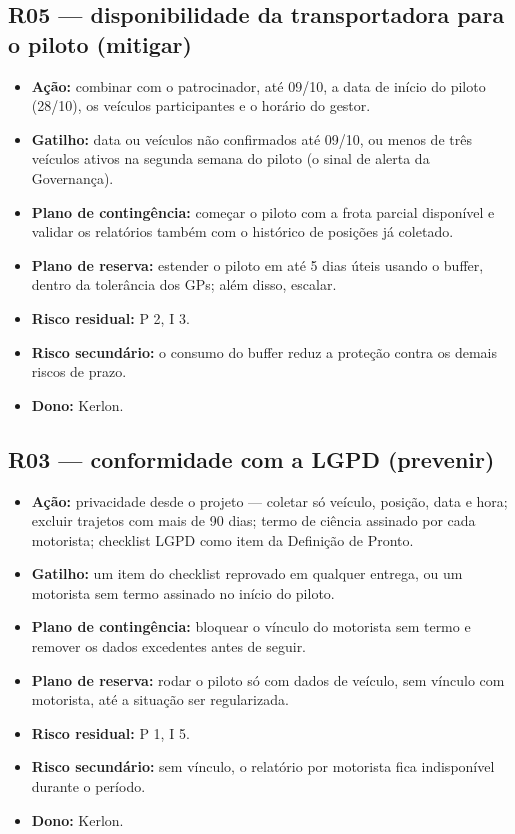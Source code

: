 \documentclass[11pt,a4paper]{article}
\begin{document}
\subsection*{R05 --- disponibilidade da transportadora para o piloto (mitigar)}
\begin{itemize}[itemsep=2pt]
  \item \textbf{Ação:} combinar com o patrocinador, até 09/10, a data de início do piloto (28/10), os veículos participantes e o horário do gestor.
  \item \textbf{Gatilho:} data ou veículos não confirmados até 09/10, ou menos de três veículos ativos na segunda semana do piloto (o sinal de alerta da Governança).
  \item \textbf{Plano de contingência:} começar o piloto com a frota parcial disponível e validar os relatórios também com o histórico de posições já coletado.
  \item \textbf{Plano de reserva:} estender o piloto em até 5 dias úteis usando o buffer, dentro da tolerância dos GPs; além disso, escalar.
  \item \textbf{Risco residual:} P 2, I 3.
  \item \textbf{Risco secundário:} o consumo do buffer reduz a proteção contra os demais riscos de prazo.
  \item \textbf{Dono:} Kerlon.
\end{itemize}

\subsection*{R03 --- conformidade com a LGPD (prevenir)}
\begin{itemize}[itemsep=2pt]
  \item \textbf{Ação:} privacidade desde o projeto --- coletar só veículo, posição, data e hora; excluir trajetos com mais de 90 dias; termo de ciência assinado por cada motorista; checklist LGPD como item da Definição de Pronto.
  \item \textbf{Gatilho:} um item do checklist reprovado em qualquer entrega, ou um motorista sem termo assinado no início do piloto.
  \item \textbf{Plano de contingência:} bloquear o vínculo do motorista sem termo e remover os dados excedentes antes de seguir.
  \item \textbf{Plano de reserva:} rodar o piloto só com dados de veículo, sem vínculo com motorista, até a situação ser regularizada.
  \item \textbf{Risco residual:} P 1, I 5.
  \item \textbf{Risco secundário:} sem vínculo, o relatório por motorista fica indisponível durante o período.
  \item \textbf{Dono:} Kerlon.
\end{itemize}
\end{document}
